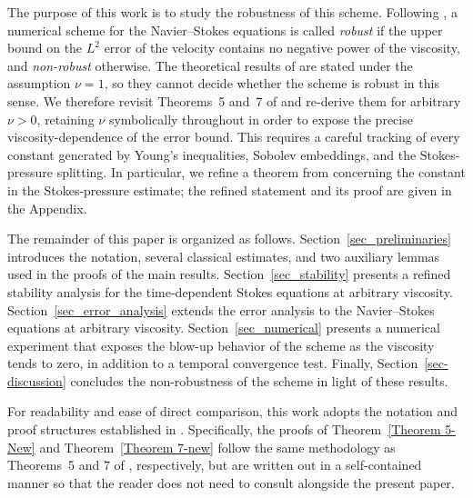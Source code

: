 \documentclass{article}
\theoremstyle{definition}                   %
\begin{document}
The purpose of this work is to study the robustness of this scheme.  Following \cite{John2021}, a numerical scheme for the Navier--Stokes equations is called \emph{robust} if the upper bound on the $L^{2}$ error of the velocity contains no negative power of the viscosity, and \emph{non-robust} otherwise.
The theoretical results of \cite{HuangShen2023} are stated under the assumption $\nu=1$, so they cannot decide whether the scheme is robust in this sense.  We therefore revisit Theorems~5 and~7 of \cite{HuangShen2023} and re-derive them for arbitrary $\nu>0$, retaining $\nu$ symbolically throughout in order to expose the precise viscosity-dependence of the error bound.  This requires a careful tracking of every constant generated by Young's inequalities, Sobolev embeddings, and the Stokes-pressure splitting.  In particular, we refine a theorem from \cite{LiuLiuPego2007} concerning the constant in the Stokes-pressure estimate; the refined statement and its proof are given in the Appendix.



The remainder of this paper is organized as follows.  Section~\ref{sec_preliminaries} introduces the notation, several classical estimates, and two auxiliary lemmas used in the proofs of the main results.  Section~\ref{sec_stability} presents a refined stability analysis for the time-dependent Stokes equations at arbitrary viscosity.  Section~\ref{sec_error_analysis} extends the error analysis to the Navier--Stokes equations at arbitrary viscosity.  Section~\ref{sec_numerical} presents a numerical experiment that exposes the blow-up behavior of the scheme as the viscosity tends to zero, in addition to a temporal convergence test.  Finally, Section~\ref{sec-discussion} concludes the non-robustness of the scheme in light of these results.


For readability and ease of direct comparison, this work adopts the notation and proof structures established in \cite{HuangShen2023}.  Specifically, the proofs of Theorem~\ref{Theorem 5-New} and Theorem~\ref{Theorem 7-new} follow the same methodology as Theorems~5 and 7 of \cite{HuangShen2023}, respectively, but are written out in a self-contained manner so that the reader does not need to consult \cite{HuangShen2023} alongside the present paper.


\end{document}
